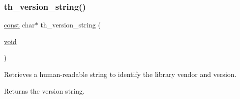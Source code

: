 \subsubsection{\texorpdfstring{th\+\_\+version\+\_\+string()}{th\_version\_string()}}
{\footnotesize\ttfamily \hyperlink{zconf_8h_a2c212835823e3c54a8ab6d95c652660e}{const} char$\ast$ th\+\_\+version\+\_\+string (\begin{DoxyParamCaption}\item[{\hyperlink{png_8h_ac9c84fa68bbad002983e35ce3663c686}{void}}]{ }\end{DoxyParamCaption})}

Retrieves a human-\/readable string to identify the library vendor and version. \begin{DoxyReturn}{Returns}
the version string. 
\end{DoxyReturn}
